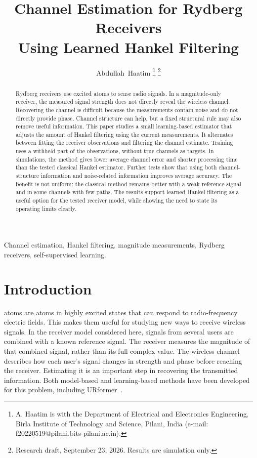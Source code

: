 \documentclass[journal]{IEEEtran}
\begin{document}
\title{Channel Estimation for Rydberg Receivers\\Using Learned Hankel Filtering}
\author{Abdullah~Haatim%
\thanks{A. Haatim is with the Department of Electrical and Electronics
Engineering, Birla Institute of Technology and Science, Pilani, India
(e-mail: f20220519@pilani.bits-pilani.ac.in).}
\thanks{Research draft, September 23, 2026. Results are simulation only.}}
\maketitle

\begin{abstract}
Rydberg receivers use excited atoms to sense radio signals. In a magnitude-only
receiver, the measured signal strength does not directly reveal the wireless
channel. Recovering the channel is difficult because the measurements contain
noise and do not directly provide phase. Channel structure can help, but a
fixed structural rule may also remove useful information. This paper studies
a small learning-based estimator that adjusts the amount of Hankel filtering
using the current measurements. It alternates between fitting the receiver
observations and filtering the channel estimate. Training uses a withheld
part of the observations, without true channels as targets. In simulations,
the method gives lower average channel error and shorter processing time than
the tested classical Hankel estimator. Further tests show that using both
channel-structure information and noise-related information improves average
accuracy. The benefit is not uniform: the classical method remains better
with a weak reference signal and in some channels with few paths. The results
support learned Hankel filtering as a useful option for the tested receiver
model, while showing the need to state its operating limits clearly.
\end{abstract}

\begin{IEEEkeywords}
Channel estimation, Hankel filtering, magnitude measurements, Rydberg
receivers, self-supervised learning.
\end{IEEEkeywords}

\section{Introduction}
 atoms are atoms in highly excited states that can
respond to radio-frequency electric fields. This makes them useful for
studying new ways to receive wireless signals. In the receiver model
considered here, signals from several users are combined with a known
reference signal. The receiver measures the magnitude of that combined
signal, rather than its full complex value. The wireless channel describes
how each user's signal changes in strength and phase before reaching the
receiver. Estimating it is an important step in recovering the transmitted
information. Both model-based and learning-based methods have been developed
for this problem, including URformer~\cite{xu2025,xiao2026}.
\end{document}
